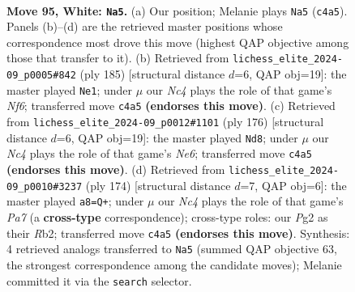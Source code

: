 \documentclass[11pt]{article}
\begin{document}
\clearpage

\begin{figure}[p]\centering
\begin{subfigure}{0.46\textwidth}\centering
\resizebox{\linewidth}{!}{%
\newchessgame
\chessboard[
  setfen={8/4R3/8/2k2K2/2N5/8/6P1/3r4 w - - 54 95},
  showmover=false,
  pgfstyle=straightmove, color=movearrow, markmove={c4-a5}
]}
\caption{}
\end{subfigure}\hfill
\begin{subfigure}{0.46\textwidth}\centering
\resizebox{\linewidth}{!}{%
\newchessgame
\chessboard[
  setfen={8/8/8/R7/8/4Kn2/1k6/8 b - - 35 93},
  showmover=false,
  pgfstyle=straightmove, color=movearrow, markmove={f3-e1}
]}
\caption{}
\end{subfigure}
\\[4pt]
\begin{subfigure}{0.46\textwidth}\centering
\resizebox{\linewidth}{!}{%
\newchessgame
\chessboard[
  setfen={8/8/4Nk2/8/8/8/3K4/r7 w - - 55 89},
  showmover=false,
  pgfstyle=straightmove, color=movearrow, markmove={e6-d8}
]}
\caption{}
\end{subfigure}\hfill
\begin{subfigure}{0.46\textwidth}\centering
\resizebox{\linewidth}{!}{%
\newchessgame
\chessboard[
  setfen={7r/P7/k2K4/8/8/8/1R6/8 w - - 11 88},
  showmover=false,
  pgfstyle=straightmove, color=movearrow, markmove={a7-a8}
]}
\caption{}
\end{subfigure}
\caption{\textbf{Move 95, White: \texttt{Na5}.} (a) Our position; Melanie plays \texttt{Na5} (\texttt{c4a5}). Panels (b)--(d) are the retrieved master positions whose correspondence most drove this move (highest QAP objective among those that transfer to it). (b) Retrieved from \texttt{lichess\_elite\_2024-09\_p0005\#842} (ply 185) [structural distance $d$=6, QAP obj=19]: the master played \texttt{Ne1}; under $\mu$ our \emph{Nc4} plays the role of that game's \emph{Nf6}; transferred move \texttt{c4a5} \textbf{(endorses this move)}. (c) Retrieved from \texttt{lichess\_elite\_2024-09\_p0012\#1101} (ply 176) [structural distance $d$=6, QAP obj=19]: the master played \texttt{Nd8}; under $\mu$ our \emph{Nc4} plays the role of that game's \emph{Ne6}; transferred move \texttt{c4a5} \textbf{(endorses this move)}. (d) Retrieved from \texttt{lichess\_elite\_2024-09\_p0010\#3237} (ply 174) [structural distance $d$=7, QAP obj=6]: the master played \texttt{a8=Q+}; under $\mu$ our \emph{Nc4} plays the role of that game's \emph{Pa7} (a \textbf{cross-type} correspondence); cross-type roles: our \emph{P}g2 as their \emph{R}b2; transferred move \texttt{c4a5} \textbf{(endorses this move)}. Synthesis: 4 retrieved analogs transferred to \texttt{Na5} (summed QAP objective 63, the strongest correspondence among the candidate moves); Melanie committed it via the \texttt{search} selector.}
\label{fig:thought-m188}
\end{figure}
\end{document}
